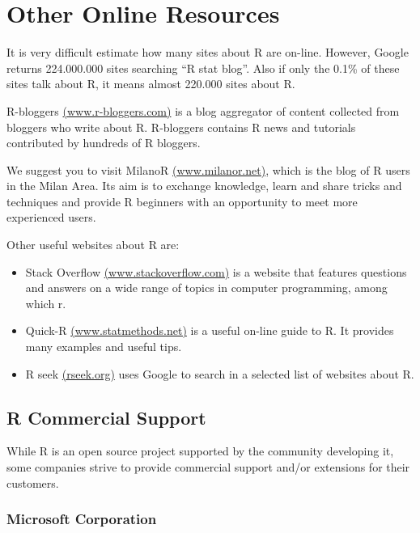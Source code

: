 \documentclass[]{book}
\providecommand{\tightlist}{%
  \setlength{\itemsep}{0pt}\setlength{\parskip}{0pt}}
\def\tightlist{}
\begin{document}
\section{Other Online Resources}\label{other-online-resources}

It is very difficult estimate how many sites about R are on-line.
However, Google returns 224.000.000 sites searching ``R stat blog''.
Also if only the 0.1\% of these sites talk about R, it means almost
220.000 sites about R.

R-bloggers \href{http://www.r-bloggers.com/}{(www.r-bloggers.com)} is a
blog aggregator of content collected from bloggers who write about R.
R-bloggers contains R news and tutorials contributed by hundreds of R
bloggers.

We suggest you to visit MilanoR
\href{http://www.milanor.net/}{(www.milanor.net)}, which is the blog of
R users in the Milan Area. Its aim is to exchange knowledge, learn and
share tricks and techniques and provide R beginners with an opportunity
to meet more experienced users.

Other useful websites about R are:

\begin{itemize}
\tightlist
\item
  Stack Overflow
  \href{http://stackoverflow.com/}{(www.stackoverflow.com)} is a website
  that features questions and answers on a wide range of topics in
  computer programming, among which r.
\item
  Quick-R \href{http://www.statmethods.net/}{(www.statmethods.net)} is a
  useful on-line guide to R. It provides many examples and useful tips.
\item
  R seek \href{http://rseek.org/}{(rseek.org)} uses Google to search in
  a selected list of websites about R.
\end{itemize}

\subsection{R Commercial Support}\label{r-commercial-support}

While R is an open source project supported by the community developing
it, some companies strive to provide commercial support and/or
extensions for their customers.

\subsubsection{Microsoft Corporation}\label{microsoft-corporation}
\end{document}
